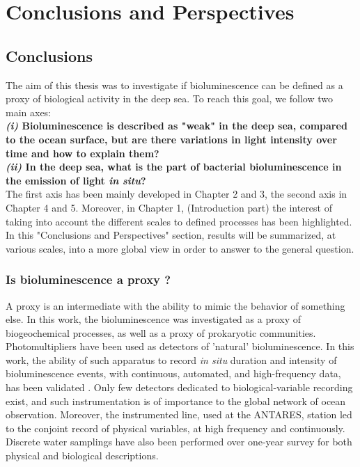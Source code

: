 \chapter{Conclusions and Perspectives }
\minitoc
\chaptermark{}{}
\newpage
\newpage
\section{Conclusions}

The aim of this thesis was to investigate if bioluminescence can be defined as a proxy of biological activity in the deep sea. To reach this goal, we follow two main axes\string: \\ 

\textbf{\textit{(i)} Bioluminescence is described as "weak" in the deep sea, compared to the ocean surface, but are there variations in light intensity over time and how to explain them?}\\

\textbf{\textit{(ii)} In the deep sea, what is the part of bacterial bioluminescence in the emission of light \textit{in situ}?}\\

The first axis has been mainly developed in Chapter 2 and 3, the second axis in Chapter 4 and 5. Moreover, in Chapter 1, (Introduction part) the interest of taking into account the different scales to defined processes has been highlighted. In this "Conclusions and Perspectives" section, results will be summarized, at various scales, into a more global view in order to answer to the general question.\\

\subsection{Is bioluminescence a proxy ?}

A proxy is an intermediate with the ability to mimic the behavior of something else. In this work, the bioluminescence was investigated as a proxy of biogeochemical processes, as well as a proxy of prokaryotic communities.\\

Photomultipliers have been used as detectors of 'natural' bioluminescence. In this work, the ability of such apparatus to record \textit{in situ} duration and intensity of bioluminescence events, with continuous, automated, and high-frequency data, has been validated \citep{tamburini2013}. Only few detectors dedicated to biological-variable recording exist, and such instrumentation is of importance to the global network of ocean observation. Moreover, the instrumented line, used at the ANTARES, station led to the conjoint record of physical variables, at high frequency and continuously. Discrete water samplings have also been performed over one-year survey for both physical and biological descriptions.\\

